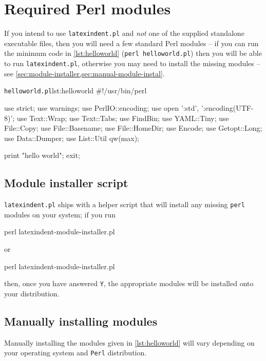 \appendix
	\section{Required Perl modules}\label{sec:requiredmodules}
	 If you intend to use \texttt{latexindent.pl} and \emph{not} one of the supplied
	 standalone executable files, then you will need a few standard Perl modules -- if you can
	 run the minimum code in \cref{lst:helloworld} (\texttt{perl helloworld.pl}) then you will
	 be able to run \texttt{latexindent.pl}, otherwise you may need to install the missing
	 modules -- see \cref{sec:module-installer,sec:manual-module-instal}.

	 \begin{cmhlistings}[style=tcblatex,language=Perl]{\texttt{helloworld.pl}}{lst:helloworld}
#!/usr/bin/perl

use strict;
use warnings;
use PerlIO::encoding;
use open ':std', ':encoding(UTF-8)';
use Text::Wrap;
use Text::Tabs;
use FindBin;
use YAML::Tiny;
use File::Copy;
use File::Basename;
use File::HomeDir;
use Encode;
use Getopt::Long;
use Data::Dumper;
use List::Util qw(max);

print "hello world";
exit;
\end{cmhlistings}

	\subsection{Module installer script}\label{sec:module-installer}
		 \texttt{latexindent.pl} ships with a
		helper script that will install any missing \texttt{perl} modules on your system; if you
		run
		\begin{commandshell}
perl latexindent-module-installer.pl
\end{commandshell}
		or
		\begin{dosprompt}
perl latexindent-module-installer.pl
 \end{dosprompt}
		then, once you have answered \texttt{Y}, the appropriate modules will be installed onto
		your distribution.

	\subsection{Manually installing modules}\label{sec:manual-module-instal}
		Manually installing the modules given in \cref{lst:helloworld} will vary depending on
		your operating system and \texttt{Perl} distribution.

